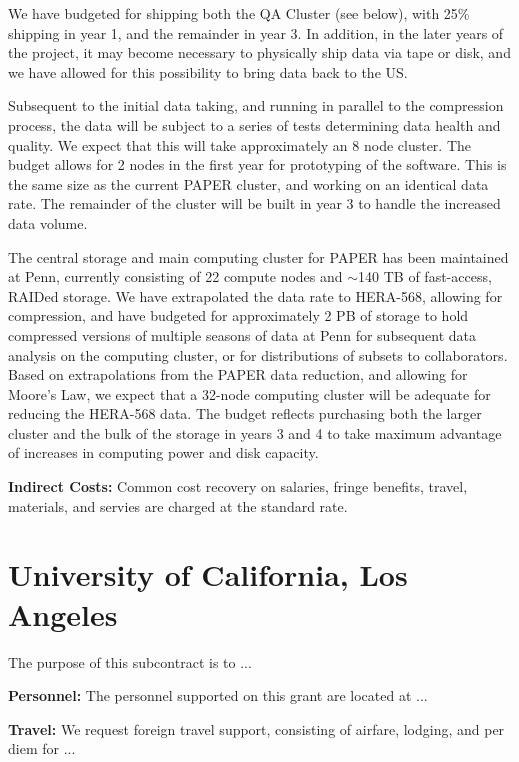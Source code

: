 \documentclass[onecolumn,11pt]{aastex}
\begin{document}
 We have budgeted for shipping both the QA Cluster (see below), with 25\% shipping in year 1, and the remainder in year 3.  In addition, in the later years of the project, it may become necessary to physically ship data via tape or disk, and we have allowed for this possibility to bring data back to the US.

  Subsequent to the initial data taking, and running in parallel to the compression process, the data will be subject to a series of tests determining data health and quality.  We expect that this will take approximately an 8 node cluster.  The budget allows for 2 nodes in the first year for prototyping of the software.  This is the same size as the current PAPER cluster, and working on an identical data rate.  The remainder of the cluster will be built in year 3 to handle the increased data volume.

 The central storage and main computing cluster for PAPER has been maintained at Penn, currently consisting of 22 compute nodes and $\sim$140 TB of fast-access, RAIDed storage.  We have extrapolated the data rate to HERA-568, allowing for compression, and have budgeted for approximately 2 PB of storage to hold compressed versions of multiple seasons of data at Penn for subsequent data analysis on the computing cluster, or for distributions of subsets to collaborators.  Based on extrapolations from the PAPER data reduction, and allowing for Moore's Law, we expect that a 32-node computing cluster will be adequate for reducing the HERA-568 data.  The budget reflects purchasing both the larger cluster and the bulk of the storage in years 3 and 4 to take maximum advantage of increases in computing power and disk capacity.

{\bf Indirect Costs:}
Common cost recovery on salaries, fringe benefits, travel, materials, and servies are charged at the standard rate.

\section*{University of California, Los Angeles}
The purpose of this subcontract is to ...

{\bf Personnel:} 
The personnel supported on this grant are located at ...

{\bf Travel:} We request foreign travel support, consisting of airfare, lodging,
and per diem for ...
\end{document}
